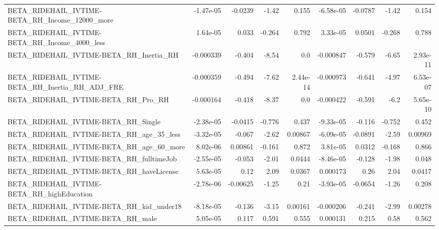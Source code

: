 \begin{tabular}{lrrrrrrrr}
BETA\_RIDEHAIL\_IVTIME-BETA\_RH\_Income\_12000\_more     &   -1.47e-05 &      -0.0239 &    -1.42 &    0.155 &  -6.58e-05 &     -0.0787 &        -1.42 &         0.154 \\
BETA\_RIDEHAIL\_IVTIME-BETA\_RH\_Income\_4000\_less      &    1.64e-05 &        0.033 &   -0.264 &    0.792 &   3.33e-05 &      0.0501 &       -0.268 &         0.788 \\
BETA\_RIDEHAIL\_IVTIME-BETA\_RH\_Inertia\_RH            &   -0.000339 &       -0.404 &    -8.54 &      0.0 &  -0.000847 &      -0.579 &        -6.65 &      2.93e-11 \\
BETA\_RIDEHAIL\_IVTIME-BETA\_RH\_Inertia\_RH\_ADJ\_FRE    &   -0.000359 &       -0.494 &    -7.62 & 2.44e-14 &  -0.000973 &      -0.641 &        -4.97 &      6.53e-07 \\
BETA\_RIDEHAIL\_IVTIME-BETA\_RH\_Pro\_RH                &   -0.000164 &       -0.418 &    -8.37 &      0.0 &  -0.000422 &      -0.591 &         -6.2 &      5.65e-10 \\
BETA\_RIDEHAIL\_IVTIME-BETA\_RH\_Single                &   -2.38e-05 &      -0.0415 &   -0.776 &    0.437 &  -9.33e-05 &      -0.116 &       -0.752 &         0.452 \\
BETA\_RIDEHAIL\_IVTIME-BETA\_RH\_age\_35\_less           &   -3.32e-05 &       -0.067 &    -2.62 &  0.00867 &  -6.09e-05 &     -0.0891 &        -2.59 &       0.00969 \\
BETA\_RIDEHAIL\_IVTIME-BETA\_RH\_age\_60\_more           &    8.02e-06 &      0.00861 &   -0.161 &    0.872 &   3.81e-05 &      0.0312 &       -0.168 &         0.866 \\
BETA\_RIDEHAIL\_IVTIME-BETA\_RH\_fulltimeJob           &   -2.55e-05 &       -0.053 &    -2.01 &   0.0444 &  -8.46e-05 &      -0.128 &        -1.98 &         0.048 \\
BETA\_RIDEHAIL\_IVTIME-BETA\_RH\_haveLicense           &    5.63e-05 &         0.12 &     2.09 &   0.0367 &   0.000173 &        0.26 &         2.04 &        0.0417 \\
BETA\_RIDEHAIL\_IVTIME-BETA\_RH\_highEducation         &   -2.78e-06 &     -0.00625 &    -1.25 &     0.21 &  -3.93e-05 &     -0.0654 &        -1.26 &         0.208 \\
BETA\_RIDEHAIL\_IVTIME-BETA\_RH\_kid\_under18           &   -8.18e-05 &       -0.136 &    -3.15 &  0.00161 &  -0.000206 &      -0.241 &        -2.99 &       0.00278 \\
BETA\_RIDEHAIL\_IVTIME-BETA\_RH\_male                  &    5.05e-05 &        0.117 &    0.591 &    0.555 &   0.000131 &       0.215 &         0.58 &         0.562 \\

\end{tabular}
